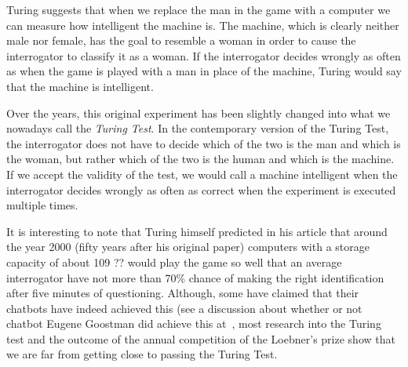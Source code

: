 Turing suggests that when we replace the man in the game with a computer we can measure how intelligent the machine is. The machine, which is clearly neither male nor female, has the goal to resemble a woman in order to cause the interrogator to classify it as a woman. If the interrogator decides wrongly as often as when the game is played with a man in place of the machine, Turing would say that the machine is intelligent.

Over the years, this original experiment has been slightly changed into what we nowadays call the \textit{Turing Test}. In the contemporary version of the Turing Test, the interrogator does not have to decide which of the two is the man and which is the woman, but rather which of the two is the human and which is the machine. If we accept the validity of the test, we would call a machine intelligent when the interrogator decides wrongly as often as correct when the experiment is executed multiple times.

It is interesting to note that Turing himself predicted in his article that around the year 2000 (fifty years after his original paper) computers with a storage capacity of about 109  ??  would play the game so well that an average interrogator have not more than 70\% chance of making the right identification after five minutes of questioning. Although, some have claimed that their chatbots have indeed achieved this (see a discussion about whether or not chatbot Eugene Goostman did achieve this at~\cite{copeland2014eugene}, most research into the Turing test and the outcome of the annual competition of the Loebner's prize show that we are far from getting close to passing the Turing Test.
